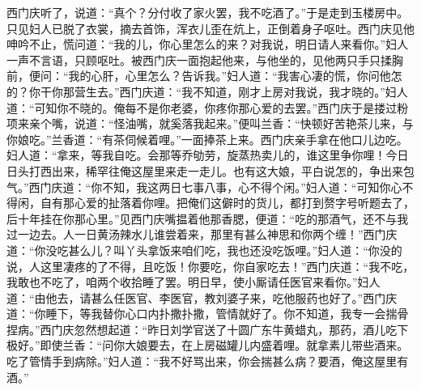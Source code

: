 西门庆听了，说道：“真个？分付收了家火罢，我不吃酒了。”于是走到玉楼房中。只见妇人已脱了衣裳，摘去首饰，浑衣儿歪在炕上，正倒着身子呕吐。西门庆见他呻吟不止，慌问道：“我的儿，你心里怎么的来？对我说，明日请人来看你。”妇人一声不言语，只顾呕吐。被西门庆一面抱起他来，与他坐的，见他两只手只揉胸前，便问：“我的心肝，心里怎么？告诉我。”妇人道：“我害心凄的慌，你问他怎的？你干你那营生去。”西门庆道：“我不知道，刚才上房对我说，我才晓的。”妇人道：“可知你不晓的。俺每不是你老婆，你疼你那心爱的去罢。”西门庆于是搂过粉项来亲个嘴，说道：“怪油嘴，就奚落我起来。”便叫兰香：“快顿好苦艳茶儿来，与你娘吃。”兰香道：“有茶伺候着哩。”一面捧茶上来。西门庆亲手拿在他口儿边吃。妇人道：“拿来，等我自吃。会那等乔劬劳，旋蒸热卖儿的，谁这里争你哩！今日日头打西出来，稀罕往俺这屋里来走一走儿。也有这大娘，平白说怎的，争出来\textHuoGuLi 包气。”西门庆道：“你不知，我这两日七事八事，心不得个闲。”妇人道：“可知你心不得闲，自有那心爱的扯落着你哩。把俺们这僻时的货儿，都打到赘字号听题去了，后十年挂在你那心里。”见西门庆嘴揾着他那香腮，便道：“吃的那酒气，还不与我过一边去。人一日黄汤辣水儿谁尝着来，那里有甚么神思和你两个缠！”西门庆道：“你没吃甚么儿？叫丫头拿饭来咱们吃，我也还没吃饭哩。”妇人道：“你没的说，人这里凄疼的了不得，且吃饭！你要吃，你自家吃去！”西门庆道：“我不吃，我敢也不吃了，咱两个收拾睡了罢。明日早，使小厮请任医官来看你。”妇人道：“由他去，请甚么任医官、李医官，教刘婆子来，吃他服药也好了。”西门庆道：“你睡下，等我替你心口内扑撒扑撒，管情就好了。你不知道，我专一会揣骨捏病。”西门庆忽然想起道：“昨日刘学官送了十圆广东牛黄蜡丸，那药，酒儿吃下极好。”即使兰香：“问你大娘要去，在上房磁罐儿内盛着哩。就拿素儿带些酒来。吃了管情手到病除。”妇人道：“我不好骂出来，你会揣甚么病？要酒，俺这屋里有酒。”

